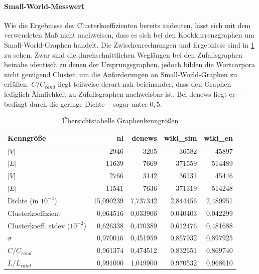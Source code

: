 \documentclass[11pt, a4paper]{article}
\begin{document}
\paragraph{Small-World-Messwert}
Wie die Ergebnisse der Clusterkoeffizienten bereits andeuten, lässt sich mit dem verwendeten Maß nicht nachweisen, dass es sich bei den Kookkurrenzgraphen um Small-World-Graphen handelt.
Die Zwischenrechnungen und Ergebnisse sind in \ref{tab-zsf} zu sehen.
Zwar sind die durchschnittlichen Weglängen bei den Zufallsgraphen beinahe identisch zu denen der Ursprungsgraphen, jedoch bilden die Wortcorpora nicht genügend Cluster, um die Anforderungen an Small-World-Graphen zu erfüllen.
$C/C_{rand}$ liegt teilweise derart nah beieinander, dass den Graphen lediglich Ähnlichkeit zu Zufallsgraphen nachweisbar ist.
Bei denews liegt er -- bedingt durch die geringe Dichte -- sogar unter $0,5$.

\begin{table}[ht]
    \begin{tabular}{l*{4}{r}}
    \toprule
    Kenngröße                     & nl        & denews    & wiki\_sim & wiki\_en \\
    \midrule
    $|V|$                          & 2946      & 3205      & 36582     & 45897  \\
    $|E|$                          & 11639     & 7669      & 371559    & 514489 \\
    $|V|$\footnotemark[6]          & 2766      & 3142      & 36131     & 45446  \\
    $|E|$\footnotemark[6]          & 11541     & 7636      & 371319    & 514248 \\
    Dichte (in $10^{-4}$)           & 15,090239 & 7,737342  & 2,844456  & 2,489951 \\
    Clusterkoeffizient             & 0,064516  & 0,033906  & 0,040403  & 0,042299 \\
    Clusterkoeff. stdev ($10^{-2}$) & 0,626338  & 0,470389  & 0,612476  & 0,481688 \\
    $\sigma$                       & 0,970016  & 0,451959  & 0,857932  & 0,897925  \\
    $C / C_{rand}$                  & 0,961374  & 0,474512  & 0,832651  & 0,869740 \\
    $L / L_{rand}$                  & 0,991090  & 1,049900  & 0,970532  & 0,968610 \\
    \bottomrule
    \end{tabular}
    \caption{Übersichtstabelle Graphenkenngrößen}
    \label{tab-zsf}
\end{table}
\end{document}
